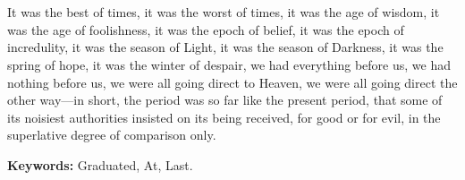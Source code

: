 \chapter*{\runtitle}

\noindent 
It was the best of times, it was the worst of times, it was the age of wisdom, it was the age of foolishness, it was the epoch of belief, it was the epoch of incredulity, it was the season of Light, it was the season of Darkness, it was the spring of hope, it was the winter of despair, we had everything before us, we had nothing before us, we were all going direct to Heaven, we were all going direct the other way—in short, the period was so far like the present period, that some of its noisiest authorities insisted on its being received, for good or for evil, in the superlative degree of comparison only.

\bigskip
\noindent\textbf{Keywords:} Graduated, At, Last.
